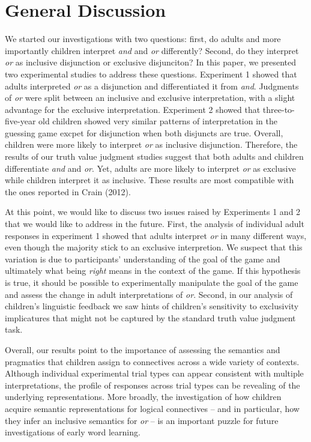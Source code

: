 \documentclass[10pt, letterpaper]{article}
\begin{document}
\section{General Discussion}\label{general-discussion}

We started our investigations with two questions: first, do adults and
more importantly children interpret \emph{and} and \emph{or}
differently? Second, do they interpret \emph{or} as inclusive
disjunction or exclusive disjunciton? In this paper, we presented two
experimental studies to address these questions. Experiment 1 showed
that adults interpreted \emph{or} as a disjunction and differentiated it
from \emph{and}. Judgments of \emph{or} were split between an inclusive
and exclusive interpretation, with a slight advantage for the exclusive
interpretation. Experiment 2 showed that three-to-five-year old children
showed very similar patterns of interpretation in the guessing game
excpet for disjunction when both disjuncts are true. Overall, children
were more likely to interpret \emph{or} as inclusive disjunction.
Therefore, the results of our truth value judgment studies suggest that
both adults and children differentiate \emph{and} and \emph{or}. Yet,
adults are more likely to interpret \emph{or} as exclusive while
children interpret it as inclusive. These results are most compatible
with the ones reported in Crain (2012).

At this point, we would like to discuss two issues raised by Experiments
1 and 2 that we would like to address in the future. First, the analysis
of individual adult responses in experiment 1 showed that adults
interpret \emph{or} in many different ways, even though the majority
stick to an exclusive interpretion. We suspect that this variation is
due to participants' understanding of the goal of the game and
ultimately what being \emph{right} means in the context of the game. If
this hypothesis is true, it should be possible to experimentally
manipulate the goal of the game and assess the change in adult
interpretations of \emph{or}. Second, in our analysis of children's
linguistic feedback we saw hints of children's sensitivity to
exclusivity implicatures that might not be captured by the standard
truth value judgment task.

Overall, our results point to the importance of assessing the semantics
and pragmatics that children assign to connectives across a wide variety
of contexts. Although individual experimental trial types can appear
consistent with multiple interpretations, the profile of responses
across trial types can be revealing of the underlying representations.
More broadly, the investigation of how children acquire semantic
representations for logical connectives -- and in particular, how they
infer an inclusive semantics for \emph{or} -- is an important puzzle for
future investigations of early word learning.
\end{document}
